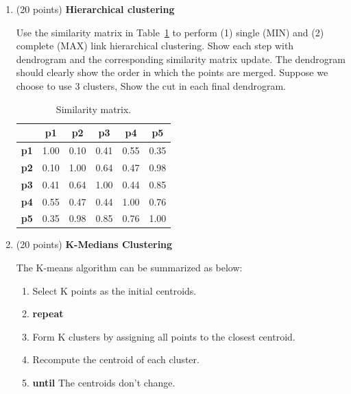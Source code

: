 \documentclass[11pt]{article}
\begin{document}
\begin{enumerate}

    \item (20 points) \textbf{Hierarchical clustering}

    Use the similarity matrix in Table~\ref{tb:exp1} to perform
    (1) single (MIN) and (2) complete (MAX) link hierarchical
    clustering. Show each step with dendrogram and the
    corresponding similarity matrix update. The dendrogram should
    clearly show the order in which the points are merged.
    Suppose we choose to use 3 clusters, Show the cut in each
    final dendrogram.

    \begin{table}[ht]\label{tb:exp1}
        \centering
        \caption{Similarity matrix.}

        \begin{tabular}{ l| c | c | c | c | c}\hline
                   & \textbf{p1} & \textbf{p2} & \textbf{p3} & \textbf{p4} & \textbf{p5} \\ \hline
            \bf p1 & 1.00        & 0.10        & 0.41        & 0.55        & 0.35        \\
            \bf p2 & 0.10        & 1.00        & 0.64        & 0.47        & 0.98        \\
            \bf p3 & 0.41        & 0.64        & 1.00        & 0.44        & 0.85        \\
            \bf p4 & 0.55        & 0.47        & 0.44        & 1.00        & 0.76        \\
            \bf p5 & 0.35        & 0.98        & 0.85        & 0.76        & 1.00        \\
            \hline
        \end{tabular}
    \end{table}

    \item (20 points) \textbf{K-Medians Clustering}
    
        The K-means algorithm can be summarized as below:
        \begin{enumerate}
            \item Select K points as the initial centroids.
            \item \textbf{repeat}
            \item \;\;\;\; Form K clusters by assigning all points to the closest centroid.
            \item \;\;\;\; Recompute the centroid of each cluster.
            \item \textbf{until} The centroids don't change.
        \end{enumerate}


\end{enumerate}
\end{document}
